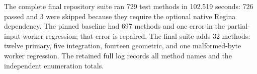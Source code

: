 The complete final repository suite ran 729 test methods in 102.519 seconds: 726 passed and 3 were skipped because they require the optional native Regina dependency. The pinned baseline had 697 methods and one error in the partial-input worker regression; that error is repaired. The final suite adds 32 methods: twelve primary, five integration, fourteen geometric, and one malformed-byte worker regression. The retained full log records all method names and the independent enumeration totals.
